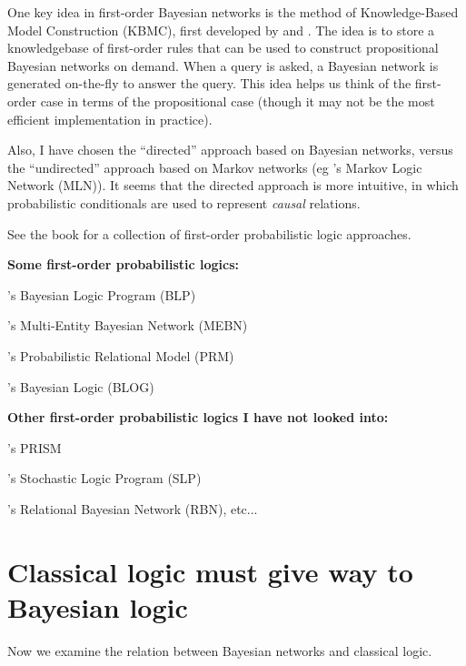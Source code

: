 One key idea in first-order Bayesian networks is the method of Knowledge-Based Model Construction (KBMC), first developed by \citep*{Wellman1992} and \citep*{Haddawy1994}.  The idea is to store a knowledgebase of first-order rules that can be used to construct propositional Bayesian networks on demand.  When a query is asked, a Bayesian network is generated on-the-fly to answer the query.  This idea helps us think of the first-order case in terms of the propositional case (though it may not be the most efficient implementation in practice).

Also, I have chosen the ``directed'' approach based on Bayesian networks, versus the ``undirected'' approach based on Markov networks (eg \citep*{Domingos2007}'s Markov Logic Network (MLN)).  It seems that the directed approach is more intuitive, in which probabilistic conditionals are used to represent \emph{causal} relations.

See the book \citep*{Getoor2007} for a collection of first-order probabilistic logic approaches.

{\bfseries Some first-order probabilistic logics:}

\citep*{Kersting2000}'s Bayesian Logic Program (BLP)

\citep*{Laskey2006}'s Multi-Entity Bayesian Network (MEBN)

\citep*{Getoor2007a}'s Probabilistic Relational Model (PRM)

\citep*{Milch2007}'s Bayesian Logic (BLOG)

{\bfseries Other first-order probabilistic logics I have not looked into:}

\citep*{Sato1997}'s PRISM

\citep*{Muggleton1996}'s Stochastic Logic Program (SLP)

\citep*{Jaeger1997}'s Relational Bayesian Network (RBN), etc...

\section{Classical logic must give way to Bayesian logic}
\label{sec:P-and-ClassicalLogic}

Now we examine the relation between Bayesian networks and classical logic.

